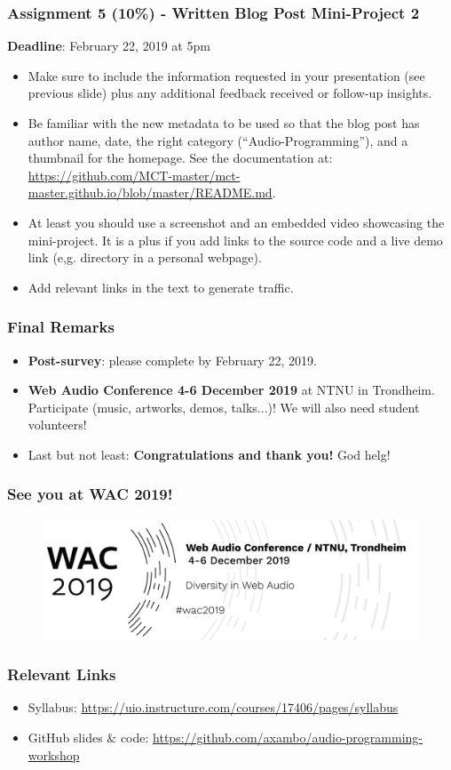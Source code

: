 \documentclass[screen, aspectratio=43]{beamer}
\begin{document}
%
\begin{frame}
\frametitle{Assignment 5 (10\%) - Written Blog Post Mini-Project 2}
\textbf{Deadline}: February 22, 2019 at 5pm
\begin{itemize}
\item Make sure to include the information requested in your presentation (see previous slide) plus any additional feedback received or follow-up insights.
\item Be familiar with the new metadata to be used so that the blog post has author name, date, the right category (``Audio-Programming''), and a thumbnail for the homepage. See the documentation at: \url{https://github.com/MCT-master/mct-master.github.io/blob/master/README.md}.
\item At least you should use a screenshot and an embedded video showcasing the mini-project. It is a plus if you add links to the source code and a live demo link (e,g. directory in a personal webpage).
\item Add relevant links in the text to generate traffic.
\end{itemize}
\end{frame}
%
\begin{frame}
\frametitle{Final Remarks}
\begin{itemize}
\item \textbf{Post-survey}: please complete by February 22, 2019.
\item \textbf{Web Audio Conference 4-6 December 2019} at NTNU in Trondheim. Participate (music, artworks, demos, talks...)! We will also need student volunteers!
\item Last but not least: \textbf{Congratulations and thank you!} God helg!
\end{itemize}
\end{frame}
%
\begin{frame}
\frametitle{See you at WAC 2019!}
   \begin{figure}
	\includegraphics[scale=0.6]{img/wac2019-header.png}
   \end{figure}
\vspace{10 mm}
\end{frame}
%
\begin{frame}
\frametitle{Relevant Links}
\begin{itemize}
\item Syllabus: \url{https://uio.instructure.com/courses/17406/pages/syllabus}
\item GitHub slides \& code: \url{https://github.com/axambo/audio-programming-workshop}
\end{itemize}
\end{frame}
%
%
\end{document}
